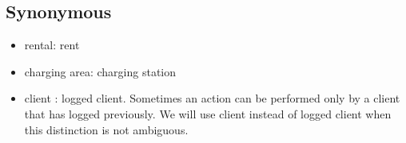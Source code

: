 \subsection{Synonymous}
\begin{itemize}
\item rental: rent 
\item charging area: charging station
\item client : logged client. Sometimes an action can be performed only by a client that has logged previously. We will use client instead of logged client when this distinction is not ambiguous.
\end{itemize}